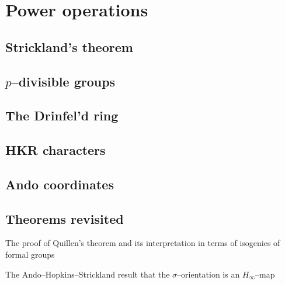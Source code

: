 
\chapter{Power operations}

\section{Strickland's theorem}

\section{$p$--divisible groups}

\section{The Drinfel'd ring}

\section{HKR characters}

\section{Ando coordinates}

\section{Theorems revisited}

The proof of Quillen's theorem and its interpretation in terms of isogenies of formal groups

The Ando--Hopkins--Strickland result that the $\sigma$--orientation is an $H_\infty$--map
